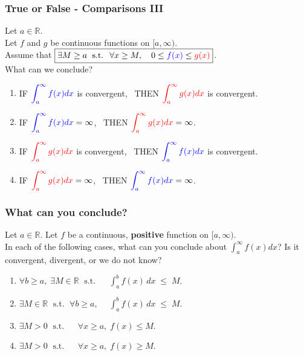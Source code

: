 \documentclass[14pt]{beamer}
\newcommand {\DS} [1] {${\displaystyle #1}$}
\newcommand {\R}{\mathbb{R}}
\newcommand{\azul}[1]{{\color{blue} #1}}
\newcommand{\rojo}[1]{{\color{red} #1}}
\newcommand{\setsize}[1]{\fontsize{#1}{#1}\selectfont} %
\newcommand{\smallerfont}{\setsize{13}} %
\begin{document}
\begin{frame}[t]
\setsize{11}
\frametitle{True or False - Comparisons III}

Let $a \in \R$. \\
Let $f$ and $g$ be continuous functions on $[a, \infty)$. \\
Assume that \DS{\boxed{\exists M \geq a \; \mbox{ s.t. } \; \forall x \geq M, \quad 0 \leq  \azul{f(x)} \leq \rojo{g(x)}}}. \\
What can we conclude?

\begin{enumerate}
	\item  IF \DS{\azul{\int_a^{\infty} f(x) dx}} is convergent, \, THEN \DS{\rojo{\int_a^{\infty} g(x) dx}} is convergent.
	\item  IF \DS{\azul{\int_a^{\infty} f(x) dx} = \infty}, \, THEN \DS{\rojo{\int_a^{\infty} g(x) dx} = \infty}.
	\item  IF \DS{\rojo{\int_a^{\infty} g(x) dx}} is convergent, \, THEN \DS{\azul{\int_a^{\infty} f(x) dx}} is convergent.
	\item  IF \DS{\rojo{\int_a^{\infty} g(x) dx} = \infty}, \, THEN \DS{\azul{\int_a^{\infty} f(x) dx} = \infty}.
\end{enumerate}

\end{frame}
\begin{frame}[t]
\smallerfont
\frametitle{What can you conclude?}

Let $a \in \R$.
Let $f$ be a continuous, {\bf positive} function on $[a, \infty)$. \\
In each of the following cases, what can you conclude about \DS{\int_a^{\infty} f(x) dx}?  \; Is it convergent, divergent, or we do not know?

\begin{enumerate}
	\item \DS{\forall b \geq a, \; \exists M \in \R \; \mbox{ s.t. } \; \quad \int_a^b f(x)\,dx \; \leq \; M}.
	\item \DS{\exists M \in \R \; \mbox{ s.t. } \; \forall b \geq a, \;  \quad \int_a^b f(x)\, dx \; \leq \; M}.
\vspace{.3cm}
	\item \DS{\exists M >0 \; \mbox{ s.t. } \; \quad \forall x \geq a, \; f(x) \leq M}.
\vspace{.3cm}
	\item \DS{\exists M >0 \; \mbox{ s.t. } \; \quad \forall x \geq a, \; f(x) \geq M}.
\end{enumerate}

\end{frame}
\end{document}
